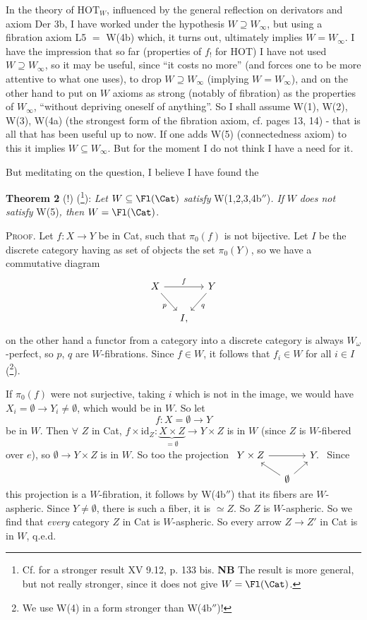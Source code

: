 In the theory of $\mathrm{HOT}_W$, influenced by the general reflection on derivators and axiom Der 3b, I have worked under the hypothesis $W \supseteq W_\infty$, but using a fibration axiom L5 $=$ W(4b) which, it turns out, ultimately implies $W = W_\infty$. I have the impression that so far (properties of $f_!$ for HOT) I have not used $W \supseteq W_\infty$, so it may be useful, since ``it costs no more'' (and forces one to be more attentive to what one uses), to drop $W \supseteq W_\infty$ (implying $W = W_\infty$), and on the other hand to put on $W$ axioms as strong (notably of fibration) as the properties of $W_\infty$, ``without depriving oneself of anything''. So I shall assume W(1), W(2), W(3), W(4a) (the strongest form of the fibration axiom, cf. pages 13, 14) - that is all that has been useful up to now. If one adds W(5) (connectedness axiom) to this it implies $W \subseteq W_\infty$. But for the moment I do not think I have a need for it.

But meditating on the question, I believe I have found the

\textbf{Theorem 2} (!) (\footnote[41]{Cf. for a stronger result XV 9.12, p. 133 bis. \textbf{NB} The result is more general, but not really stronger, since it does not give $W = \Fl(\Cat)$.}): \textit{Let} $W \subseteq \Fl(\Cat)$ \textit{satisfy} W(1,2,3,4b$''$)\textit{. If} $W$ \textit{does not satisfy} W(5)\textit{, then} $W = \Fl(\Cat)$.

\textsc{Proof}. Let $f : X \longrightarrow Y$ be in Cat, such that $\pi_0(f)$ is not bijective. Let $I$ be the discrete category having as set of objects the set $\pi_0(Y)$, so we have a commutative diagram
\[
\begin{tikzcd}[column sep=small]
X \arrow[rr, "f"] \arrow[dr, "p"'] & & Y \arrow[dl, "q"] \\
& I, &
\end{tikzcd}
\]
on the other hand a functor from a category into a discrete category is always $W_\omega$-perfect, so $p$, $q$ are $W$-fibrations. Since $f \in W$, it follows that $f_i \in W$ for all $i \in I$ (\footnote[42]{We use W(4) in a form stronger than W(4b$''$)!}).

If $\pi_0(f)$ were not surjective, taking $i$ which is not in the image, we would have $X_i = \emptyset \longrightarrow Y_i \neq \emptyset$, which would be in $W$. So let
\[
f : X = \emptyset \longrightarrow Y
\]
be in $W$. Then $\forall$ $Z$ in Cat, $f \times \mathrm{id}_Z : \underbrace{X \times Z}_{= \emptyset} \longrightarrow Y \times Z$ is in $W$ (since $Z$ is
$W$-fibered over $e$), so $\emptyset \longrightarrow Y \times Z$ is in $W$. So too the projection
$\begin{tikzcd}[column sep=small, row sep=small, baseline=(\tikzcdmatrixname-1-1.base)]
Y \times Z \arrow[rr] & & Y. \\
& \emptyset \arrow[ul] \arrow[ur] &
\end{tikzcd}$
Since this projection is a $W$-fibration, it follows by W(4b$''$) that its fibers are $W$-aspheric. Since $Y \neq \emptyset$, there is such a fiber, it is $\simeq Z$. So $Z$ is $W$-aspheric. So we find that \textit{every} category $Z$ in Cat is $W$-aspheric. So every arrow $Z \longrightarrow Z'$ in Cat is in $W$, q.e.d.

